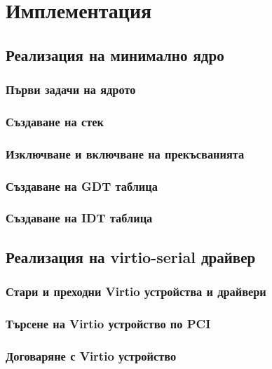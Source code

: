 \chapter{Имплементация} %
\section{Реализация на минимално ядро}
  \subsection{Първи задачи на ядрото}

  \subsection{Създаване на стек}

  \subsection{Изключване и включване на прекъсванията}

  \subsection{Създаване на GDT таблица}

  \subsection{Създаване на IDT таблица}

\section{Реализация на virtio-serial драйвер}
  \subsection{Стари и преходни Virtio устройства и драйвери}

  \subsection{Търсене на Virtio устройство по PCI}

  \subsection{Договаряне с Virtio устройство}

